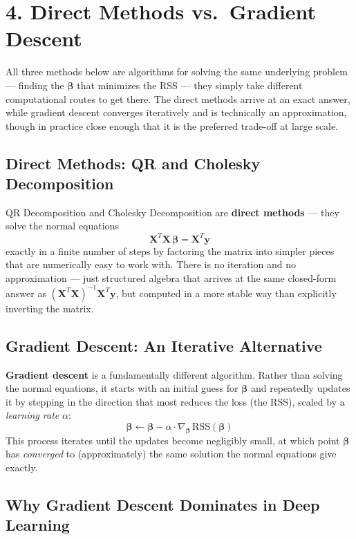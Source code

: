 \documentclass[12pt]{article}
\begin{document}
\section*{4. Direct Methods vs.\ Gradient Descent}
 
All three methods below are algorithms for solving the same underlying problem --- finding the $\boldsymbol{\beta}$ that minimizes the RSS --- they simply take different computational routes to get there. The direct methods arrive at an exact answer, while gradient descent converges iteratively and is technically an approximation, though in practice close enough that it is the preferred trade-off at large scale.
 
\subsection*{Direct Methods: QR and Cholesky Decomposition}
 
QR Decomposition and Cholesky Decomposition are \textbf{direct methods} --- they solve the normal equations
\[
\mathbf{X}^T\mathbf{X}\,\boldsymbol{\beta} = \mathbf{X}^T\mathbf{y}
\]
exactly in a finite number of steps by factoring the matrix into simpler pieces that are numerically easy to work with. There is no iteration and no approximation --- just structured algebra that arrives at the same closed-form answer as $(\mathbf{X}^T\mathbf{X})^{-1}\mathbf{X}^T\mathbf{y}$, but computed in a more stable way than explicitly inverting the matrix.
 
\subsection*{Gradient Descent: An Iterative Alternative}
 
\textbf{Gradient descent} is a fundamentally different algorithm. Rather than solving the normal equations, it starts with an initial guess for $\boldsymbol{\beta}$ and repeatedly updates it by stepping in the direction that most reduces the loss (the RSS), scaled by a \emph{learning rate} $\alpha$:
\[
\boldsymbol{\beta} \leftarrow \boldsymbol{\beta} - \alpha \cdot \nabla_{\boldsymbol{\beta}}\,\text{RSS}(\boldsymbol{\beta})
\]
This process iterates until the updates become negligibly small, at which point $\boldsymbol{\beta}$ has \emph{converged} to (approximately) the same solution the normal equations give exactly.
 
\subsection*{Why Gradient Descent Dominates in Deep Learning}
 
\end{document}
